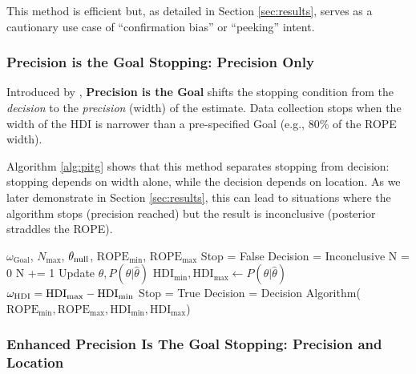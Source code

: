 This method is efficient but, as detailed in Section \ref{sec:results}, serves as a
cautionary use case of ``confirmation bias'' or ``peeking'' intent. %

\subsubsection{Precision is the Goal Stopping: Precision Only}

Introduced by \cite{kruschke2015doing}, \textbf{Precision is the Goal} shifts the stopping condition from the \textit{decision} to the \textit{precision} (width) of the estimate. Data collection stops when the width of the HDI is narrower than a pre-specified Goal (e.g., 80\% of the ROPE width).

Algorithm \ref{alg:pitg} shows that this method separates stopping from decision:
stopping depends on width alone, while the decision depends on location.
As we later demonstrate in Section \ref{sec:results}, this can lead to situations where
the algorithm stops (precision reached) but the result is inconclusive (posterior straddles the ROPE).

\begin{algorithm}
    \caption{Precision is the Goal}\label{alg:pitg}
    \begin{algorithmic}
    \Require $\omega_\mathrm{Goal}$, $N_\mathrm{max}$, $\theta_{\rm null}$, $\mathrm{ROPE}_\mathrm{min}$, $\mathrm{ROPE}_\mathrm{max}$
    \State Stop = False
    \State Decision = Inconclusive
    \State N = 0
    \State N += 1 
    \State Update $\hat\theta, P(\theta|\hat\theta)$ 
    \State $\mathrm{HDI}_\mathrm{min}, \mathrm{HDI}_\mathrm{max} \gets P(\theta|\hat\theta)$
    \State $\omega_{\rm HDI} = \mathrm{HDI}_\mathrm{max} - \mathrm{HDI}_\mathrm{min}$
         \State \HiLi Stop = True 
         \State Decision = Decision Algorithm($\mathrm{ROPE}_\mathrm{min}, \mathrm{ROPE}_\mathrm{max}, \mathrm{HDI}_\mathrm{min}, \mathrm{HDI}_\mathrm{max}$)  
    \EndIf
    \EndWhile
    \end{algorithmic}
\end{algorithm}

\subsubsection{Enhanced Precision Is The Goal Stopping: Precision and Location}\label{sec:enhanced_pitg}

